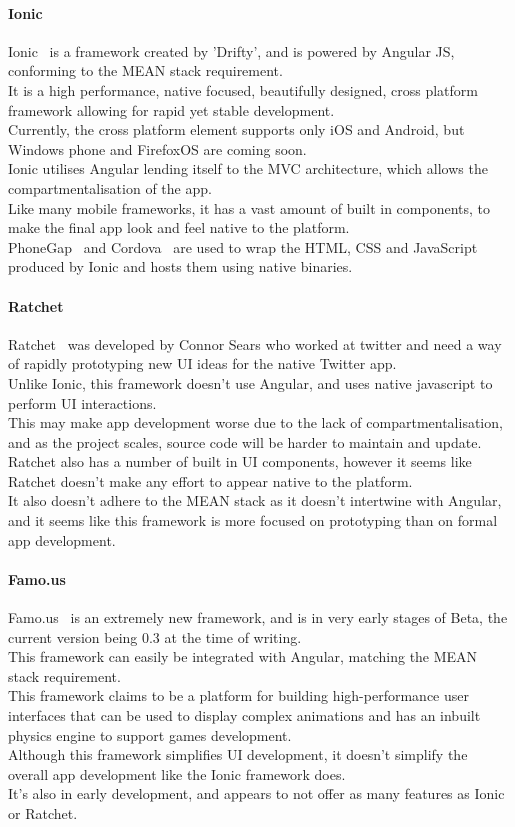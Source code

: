 \documentclass[draft,preprint,12pt,3p]{elsarticle}
\begin{document}
\paragraph{Ionic}
Ionic~\cite{ionic} is a framework created by 'Drifty', and is powered by Angular JS, conforming to the MEAN stack requirement.\\
It is a high performance, native focused, beautifully designed, cross platform framework allowing for rapid yet stable development.\\
Currently, the cross platform element supports only iOS and Android, but Windows phone and FirefoxOS are coming soon.\\
Ionic utilises Angular lending itself to the MVC architecture, which allows the compartmentalisation of the app.\\
Like many mobile frameworks, it has a vast amount of built in components, to make the final app look and feel native to the platform.\\ PhoneGap~\cite{phonegap} and Cordova~\cite{Cordova} are used to wrap the HTML, CSS and JavaScript produced by Ionic and hosts them using native binaries.

\paragraph{Ratchet}
Ratchet~\cite{ratchet} was developed by Connor Sears who worked at twitter and need a way of rapidly prototyping new UI ideas for the native Twitter app.\\
Unlike Ionic, this framework doesn't use Angular, and uses native javascript to perform UI interactions.\\
This may make app development worse due to the lack of compartmentalisation, and as the project scales, source code will be harder to maintain and update.\\
Ratchet also has a number of built in UI components, however it seems like Ratchet doesn't make any effort to appear native to the platform.\\
It also doesn't adhere to the MEAN stack as it doesn't intertwine with Angular, and it seems like this framework is more focused on prototyping than on formal app development.

\paragraph{Famo.us}
Famo.us~\cite{famous} is an extremely new framework, and is in very early stages of Beta, the current version being 0.3 at the time of writing.\\
This framework can easily be integrated with Angular, matching the MEAN stack requirement.\\
This framework claims to be a platform for building high-performance user interfaces that can be used to display complex animations and has an inbuilt physics engine to support games development.\\
Although this framework simplifies UI development, it doesn't simplify the overall app development like the Ionic framework does.\\
It's also in early development, and appears to not offer as many features as Ionic or Ratchet.
\end{document}
